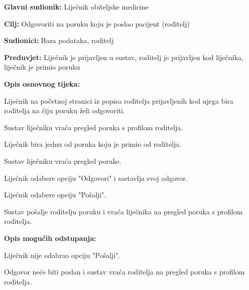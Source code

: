 					\noindent {}
					\begin{packed_item}
						
						\item \textbf{Glavni sudionik: }Liječnik obiteljske medicine
						\item  \textbf{Cilj:} Odgovoriti na poruku koju je poslao pacijent (roditelj)
						\item  \textbf{Sudionici:} Baza podataka, roditelj
						\item  \textbf{Preduvjet:} Liječnik je prijavljen u sustav, roditelj je prijavljen kod liječnika, liječnik je primio poruku
						\item  \textbf{Opis osnovnog tijeka:}
						
						\item[] \begin{packed_enum}
							
							\item Liječnik na početnoj stranici iz popisa roditelja prijavljenih kod njega bira roditelja na čiju poruku želi odgovoriti.
							\item Sustav liječniku vraća pregled poruka s profilom roditelja.
							\item Liječnik bira jednu od poruka koju je primio od roditelja.
							\item Sustav liječniku vraća pregled poruke.
							\item Liječnik odabere opciju "Odgovori" i sastavlja svoj odgovor.
							\item Liječnik odabere opciju "Pošalji".
							\item Sustav pošalje roditelju poruku i vraća liječnika na pregled poruka s profilom roditelja.
						\end{packed_enum}
						
						\item  \textbf{Opis mogućih odstupanja:}
						
						\item[] \begin{packed_item}
							
							\item[6.a] Liječnik nije odabrao opciju "Pošalji".
							\item[] \begin{packed_enum}
								
								\item Odgovor neće biti poslan i sustav vraća roditelja na pregled poruka s profilom roditelja.
							\end{packed_enum}
							
							
						\end{packed_item}
						
						
					\end{packed_item}
					
